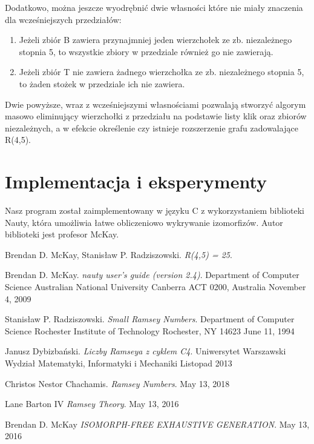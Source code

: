 \documentclass[11pt]{article}
\begin{document}
Dodatkowo, można jeszcze wyodrębnić dwie własności które nie miały znaczenia dla wcześniejszych przedziałów:
\begin{enumerate}
\item Jeżeli zbiór B zawiera przynajmniej jeden wierzchołek ze zb. niezależnego stopnia 5, to wszystkie zbiory w przedziale również go nie zawierają. 

\item Jeżeli zbiór T nie zawiera żadnego wierzchołka ze zb. niezależnego stopnia 5, to żaden stożek w przedziale ich nie zawiera.
\end {enumerate}
Dwie powyższe, wraz z wcześniejszymi własnościami pozwalają stworzyć algorym masowo eliminujący wierzchołki z przedziału na podstawie listy klik oraz zbiorów niezależnych, a w efekcie określenie czy istnieje rozszerzenie grafu zadowalające R(4,5).

\section{Implementacja i eksperymenty}
Nasz program został zaimplementowany w języku C z wykorzystaniem biblioteki Nauty, która umożliwia łatwe obliczeniowo wykrywanie izomorfizów.
Autor biblioteki jest profesor McKay. 

\begin{thebibliography}{9}
  Brendan D. McKay, Stanisław P. Radziszowski. 
  \textit{R(4,5) = 25}. 
  
  Brendan D. McKay.
  \textit{nauty user's guide (version 2.4)}.  
  Department of Computer Science
  Australian National University
  Canberra ACT 0200, Australia
  November 4, 2009

  Stanisław P. Radziszowski.
  \textit{Small Ramsey Numbers}.  
  Department of Computer Science Rochester Institute of Technology Rochester, NY 14623
  June 11, 1994

  Janusz Dybizbański.
  \textit{Liczby Ramseya z cyklem C4}.  
  Uniwersytet Warszawski
  Wydział Matematyki, Informatyki i Mechaniki
  Listopad 2013

  Christos Nestor Chachamis.
  \textit{Ramsey Numbers}.  
  May 13, 2018

  Lane Barton IV
  \textit{Ramsey Theory}.  
  May 13, 2016

  Brendan D. McKay
  \textit{ISOMORPH-FREE EXHAUSTIVE GENERATION}.  
  May 13, 2016

  \end{thebibliography}
\end{document}
